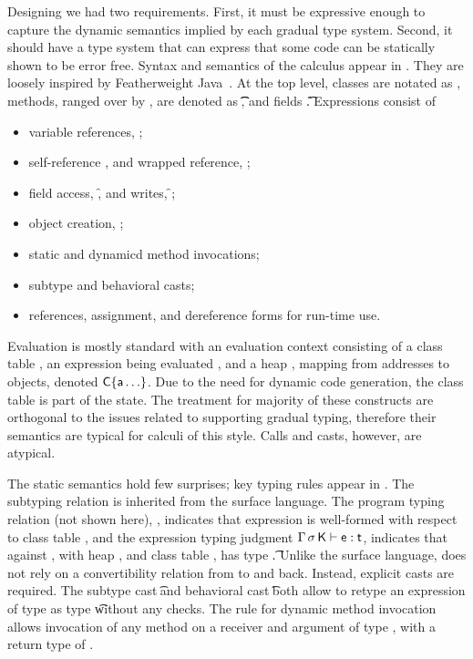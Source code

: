 \documentclass[USenglish]{tex/lipics-v2016}
\begin{document}
Designing \kafka we had two requirements. First, it must be expressive
enough to capture the dynamic semantics implied by each gradual type
system. Second, it should have a type system that can express that some code
can be statically shown to be error free.  Syntax and semantics of the
calculus appear in . They are loosely inspired by
Featherweight Java~\cite{FJ}.  At the top level, classes are notated as
\Class{}, methods, ranged over by \md, are denoted as
\Mdef\m\x\t\t\e, and fields \Fdef\f\t. Expressions consist of

\vspace{-2mm}

\begin{itemize}
\item variable references, \x;
\item self-reference \this, and wrapped reference, \that;
\item field access, \FRead\f, and writes, \FWrite\f\e;
\item object creation, \New{};
\item static and dynamicd method invocations;
\item subtype and behavioral casts;
\item references, assignment, and dereference forms for run-time use.
\end{itemize}

\noindent
Evaluation is mostly standard with an evaluation context consisting of a
class table \K, an expression being evaluated \e, and a heap \s, mapping
from addresses \a to objects, denoted $\C\{\a\ldots\}$. Due to the need for
dynamic code generation, the class table is part of the state.  The
treatment for majority of these constructs are orthogonal to the issues
related to supporting gradual typing, therefore their semantics are typical
for calculi of this style.  Calls and casts, however, are atypical.

The static semantics hold few surprises; key typing rules appear in
. The subtyping relation is inherited from the surface
language.  The program typing relation (not shown here), \WFp\e\K, indicates
that expression \e is well-formed with respect to class table \K, and the
expression typing judgment $\EnvType \Env\s\K\e\t$, indicates that against
\Env, with heap \s, and class table \K, \e has type \t.  Unlike the surface
language, \kafka does not rely on a convertibility relation from \any to \C
and back.  Instead, explicit casts are required. The subtype cast
\SubCast\t\e and behavioral cast \BehCast\t\e both allow to retype an
expression \e of type \tp as type \t without any checks. The 
rule for dynamic method invocation \DynCall\e\m\ep allows invocation of
any method \m on a receiver and argument of type \any, with a return type
of \any.
\end{document}
